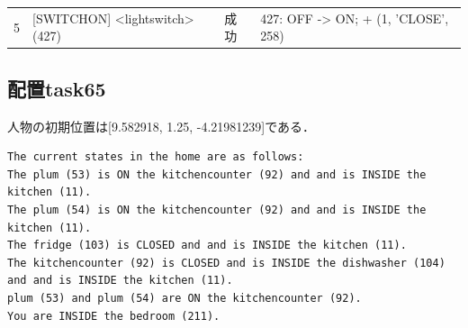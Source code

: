 {\begin{longtable}{rp{.28\linewidth}lp{.48\linewidth}}
5 & [SWITCHON] \textless{}lightswitch\textgreater{} (427) & 成功 & 427: OFF -\textgreater{} ON; + (1, 'CLOSE', 258) \\
\end{longtable}}

\subsection{配置task65}
人物の初期位置は[9.582918, 1.25, -4.21981239]である．
\begin{lstlisting}[basicstyle=\ttfamily\scriptsize,breaklines=true,caption={最初の判定へ送信した環境知識全文}]
The current states in the home are as follows: 
The plum (53) is ON the kitchencounter (92) and and is INSIDE the kitchen (11).
The plum (54) is ON the kitchencounter (92) and and is INSIDE the kitchen (11).
The fridge (103) is CLOSED and and is INSIDE the kitchen (11).
The kitchencounter (92) is CLOSED and is INSIDE the dishwasher (104) and and is INSIDE the kitchen (11).
plum (53) and plum (54) are ON the kitchencounter (92).
You are INSIDE the bedroom (211).

\end{lstlisting}
